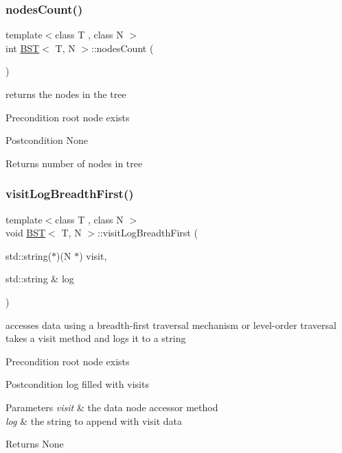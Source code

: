 \subsubsection{\texorpdfstring{nodes\+Count()}{nodesCount()}}
{\footnotesize\ttfamily template$<$class T , class N $>$ \\
int \hyperlink{class_b_s_t}{B\+ST}$<$ T, N $>$\+::nodes\+Count (\begin{DoxyParamCaption}{ }\end{DoxyParamCaption})}

returns the nodes in the tree \begin{DoxyPrecond}{Precondition}
root node exists 
\end{DoxyPrecond}
\begin{DoxyPostcond}{Postcondition}
None 
\end{DoxyPostcond}
\begin{DoxyReturn}{Returns}
number of nodes in tree 
\end{DoxyReturn}
\mbox{\label{class_b_s_t_a3e958de8a85c1268b11006a3ed32a7bb}} 
\subsubsection{\texorpdfstring{visit\+Log\+Breadth\+First()}{visitLogBreadthFirst()}}
{\footnotesize\ttfamily template$<$class T , class N $>$ \\
void \hyperlink{class_b_s_t}{B\+ST}$<$ T, N $>$\+::visit\+Log\+Breadth\+First (\begin{DoxyParamCaption}\item[{std\+::string($\ast$)(N $\ast$)}]{visit,  }\item[{std\+::string \&}]{log }\end{DoxyParamCaption})}

accesses data using a breadth-\/first traversal mechanism or level-\/order traversal takes a visit method and logs it to a string \begin{DoxyPrecond}{Precondition}
root node exists 
\end{DoxyPrecond}
\begin{DoxyPostcond}{Postcondition}
log filled with visits 
\end{DoxyPostcond}

\begin{DoxyParams}{Parameters}
{\em visit} & the data node accessor method \\
\hline
{\em log} & the string to append with visit data \\
\hline
\end{DoxyParams}
\begin{DoxyReturn}{Returns}
None 
\end{DoxyReturn}
\mbox{\label{class_b_s_t_a04d669d91c9528c61f618d022999ea26}} 
